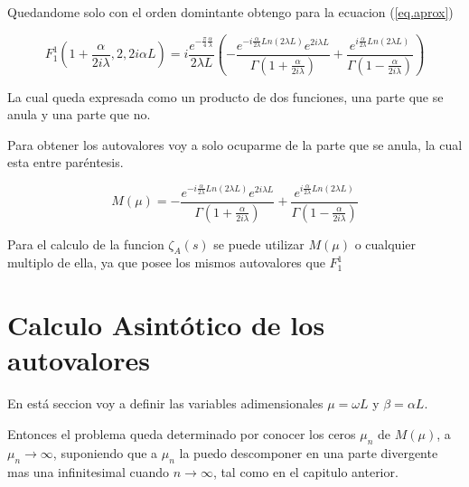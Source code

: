 Quedandome solo con el orden domintante obtengo para la ecuacion (\ref{eq.aprox}) %

\begin{equation}
    F _1 ^1 (1+  \frac{  \alpha}{2 i \lambda} ,2 ,2 i \alpha L  ) = 
   i  \frac{e ^{- \frac{\pi}{4} \frac{\alpha}{\lambda} } }{2 \lambda L}
    \left( -
    \frac{e ^{- i \frac{\alpha}{2 \lambda} Ln(2 \lambda L) } e ^{2 i \lambda L} }{\Gamma(1+\frac{ \alpha}{2 i \lambda})} +
    \frac{e ^{  i \frac{\alpha}{2 \lambda} Ln(2 \lambda L) }}               {\Gamma(1-\frac{ \alpha}{2 i \lambda})}
    \right)
\label{eq.completa}
\end{equation}




La cual queda expresada como un producto de dos funciones, una parte que se anula y una parte que no.

Para obtener los autovalores voy a solo ocuparme de la parte que se anula, la cual esta entre paréntesis.

\begin{equation}
    M (\mu) = 
    - \frac{e ^{- i \frac{\alpha}{2 \lambda} Ln(2 \lambda L) } e ^{2 i \lambda L} }{\Gamma(1+\frac{ \alpha}{2 i \lambda})} +
    \frac{e ^{  i \frac{\alpha}{2 \lambda} Ln(2 \lambda L) }}               {\Gamma(1-\frac{ \alpha}{2 i \lambda})}
\label{eq.aproxx}
\end{equation}

Para el calculo de la funcion $\zeta _A (s) $ se puede utilizar $M ( \mu )$ o cualquier multiplo de ella, ya que posee los mismos autovalores que $F_1 ^1 $




\section{Calculo Asintótico de los autovalores}


En está seccion voy a definir las variables adimensionales $\mu = \omega L $ y $\beta = \alpha L$.

Entonces el problema queda determinado por conocer los ceros $\mu _n$ de $M(\mu)$, a $\mu _n \rightarrow{\infty}$, suponiendo que a $\mu _n$ la puedo descomponer en una parte divergente mas una infinitesimal cuando $n \rightarrow{\infty}$, tal como en el capitulo anterior.


